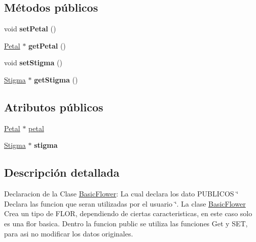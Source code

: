\subsection*{Métodos públicos}
\begin{DoxyCompactItemize}
\item 
\mbox{\label{class_basic_flower_ac3e16a24c7d5455788751427cfb87850}} 
void {\bfseries set\+Petal} ()
\item 
\mbox{\label{class_basic_flower_a580611b6b079b875875f06dae0657c38}} 
\mbox{\hyperlink{class_petal}{Petal}} $\ast$ {\bfseries get\+Petal} ()
\item 
\mbox{\label{class_basic_flower_a5d3135f1753631e9d2a01de6d40184e8}} 
void {\bfseries set\+Stigma} ()
\item 
\mbox{\label{class_basic_flower_a30bafa765344b162b3a49c80a70c78ee}} 
\mbox{\hyperlink{class_stigma}{Stigma}} $\ast$ {\bfseries get\+Stigma} ()
\end{DoxyCompactItemize}
\subsection*{Atributos públicos}
\begin{DoxyCompactItemize}
\item 
\mbox{\hyperlink{class_petal}{Petal}} $\ast$ \mbox{\hyperlink{class_basic_flower_a7adedb18ffb4d77cf988168828c1065f}{petal}}
\item 
\mbox{\label{class_basic_flower_af7f27a818b9fd75289663c828bb1aa9e}} 
\mbox{\hyperlink{class_stigma}{Stigma}} $\ast$ {\bfseries stigma}
\end{DoxyCompactItemize}


\subsection{Descripción detallada}
Declaracion de la Clase \mbox{\hyperlink{class_basic_flower}{Basic\+Flower}}\+: La cual declara los dato P\+U\+B\+L\+I\+C\+OS \char`\"{} Declara las funcion que seran utilizadas por el usuario \char`\"{}. La clase \mbox{\hyperlink{class_basic_flower}{Basic\+Flower}} Crea un tipo de F\+L\+OR, dependiendo de ciertas caracteristicas, en este caso solo es una flor basica. Dentro la funcion public se utiliza las funciones Get y S\+ET, para asi no modificar los datos originales. 

